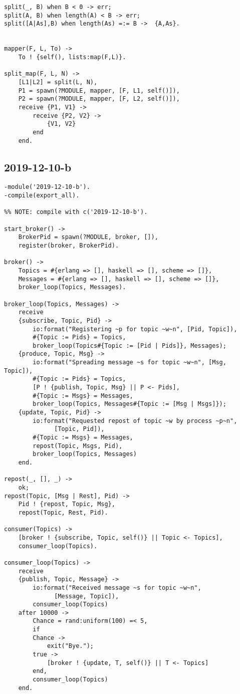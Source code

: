 \begin{lstlisting}
split(_, B) when B < 0 -> err;
split(A, B) when length(A) < B -> err;
split([A|As],B) when length(As) =:= B ->  {A,As}.
    

mapper(F, L, To) ->
    To ! {self(), lists:map(F,L)}.

split_map(F, L, N) ->
    [L1|L2] = split(L, N),
    P1 = spawn(?MODULE, mapper, [F, L1, self()]),
    P2 = spawn(?MODULE, mapper, [F, L2, self()]),
    receive {P1, V1} ->
        receive {P2, V2} ->
            {V1, V2}
        end
    end.
\end{lstlisting}


\subsection{2019-12-10-b}
\begin{lstlisting}
-module('2019-12-10-b').
-compile(export_all).

%% NOTE: compile with c('2019-12-10-b').

start_broker() ->
    BrokerPid = spawn(?MODULE, broker, []),
    register(broker, BrokerPid).

broker() ->
    Topics = #{erlang => [], haskell => [], scheme => []},
    Messages = #{erlang => [], haskell => [], scheme => []},
    broker_loop(Topics, Messages).

broker_loop(Topics, Messages) ->
    receive
	{subscribe, Topic, Pid} ->
	    io:format("Registering ~p for topic ~w~n", [Pid, Topic]),
	    #{Topic := Pids} = Topics,
	    broker_loop(Topics#{Topic := [Pid | Pids]}, Messages);
	{produce, Topic, Msg} ->
	    io:format("Spreading message ~s for topic ~w~n", [Msg, Topic]),
	    #{Topic := Pids} = Topics,
	    [P ! {publish, Topic, Msg} || P <- Pids],
	    #{Topic := Msgs} = Messages,
	    broker_loop(Topics, Messages#{Topic := [Msg | Msgs]});
	{update, Topic, Pid} ->
	    io:format("Requested repost of topic ~w by process ~p~n",
		      [Topic, Pid]),
	    #{Topic := Msgs} = Messages,
	    repost(Topic, Msgs, Pid),
	    broker_loop(Topics, Messages)
    end.

repost(_, [], _) ->
    ok;
repost(Topic, [Msg | Rest], Pid) ->
    Pid ! {repost, Topic, Msg},
    repost(Topic, Rest, Pid).

consumer(Topics) ->
    [broker ! {subscribe, Topic, self()} || Topic <- Topics],
    consumer_loop(Topics).

consumer_loop(Topics) ->
    receive
	{publish, Topic, Message} ->
	    io:format("Received message ~s for topic ~w~n",
		      [Message, Topic]),
	    consumer_loop(Topics)
    after 10000 ->
	    Chance = rand:uniform(100) =< 5,
	    if
		Chance ->
		    exit("Bye.");
		true ->
		    [broker ! {update, T, self()} || T <- Topics]
	    end,
	    consumer_loop(Topics)
    end.


\end{lstlisting}
